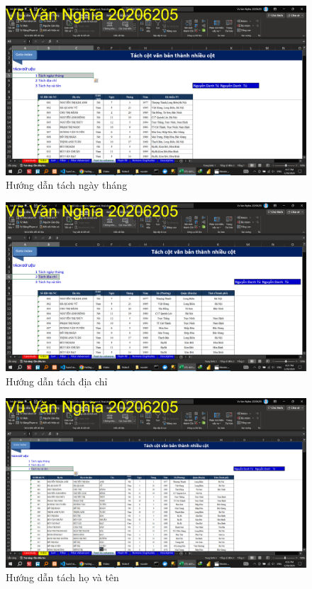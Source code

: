 \documentclass{article}
\begin{document}
\begin{figure}[h]
    \centering
    \includegraphics[scale = 0.15]{Video1/HuongDan/8.png}
    \caption{Hướng dẫn tách ngày tháng}
\end{figure}
\begin{figure}[h]
    \centering
    \includegraphics[scale = 0.15]{Video1/HuongDan/9.png}
    \caption{Hướng dẫn tách địa chỉ}
\end{figure}
\begin{figure}[h]
    \centering
    \includegraphics[scale = 0.15]{Video1/HuongDan/10.png}
    \caption{Hướng dẫn tách họ và tên}
\end{figure}
\end{document}
